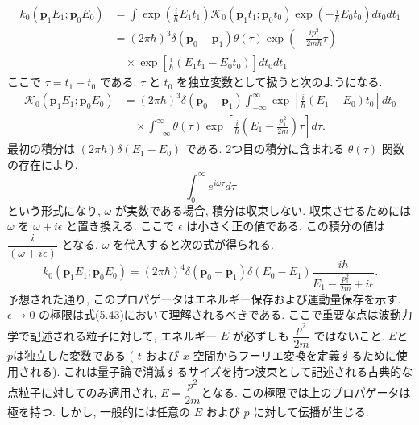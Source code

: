 \documentclass{jsarticle}
\begin{document}
\begin{align*}
    k_0(\mathbf{p}_1 E_1; \mathbf{p}_0 E_0) &= \int \exp \left( \frac{i}{\hbar} E_1 t_1 \right) \mathcal{K}_0(\mathbf{p}_1 t_1; \mathbf{p}_0 t_0) \exp \left( - \frac{i}{\hbar} E_0 t_0 \right) dt_0 dt_1 \\
    &= (2\pi \hbar)^3 \delta(\mathbf{p}_0 - \mathbf{p}_1) \theta(\tau) \exp \left( - \frac{ip_1^2}{2m\hbar} \tau \right) \\
    &\quad \times \exp \left[ \frac{i}{\hbar} (E_1 t_1 - E_0 t_0) \right] dt_0 dt_1 \tag{5.42}
\end{align*}
ここで $\tau = t_1 - t_0$ である. $\tau$ と $t_0$ を独立変数として扱うと次のようになる.
\begin{align*}
    \mathcal{K}_0(\mathbf{p}_1 E_1; \mathbf{p}_0 E_0) &= (2\pi \hbar)^3 \delta(\mathbf{p}_0 - \mathbf{p}_1) \int_{-\infty}^{\infty} \exp \left[ \frac{i}{\hbar} (E_1 - E_0) t_0 \right] dt_0 \\
    &\quad \times \int_{-\infty}^{\infty} \theta(\tau) \exp \left[ \frac{i}{\hbar} \left( E_1 - \frac{p_1^2}{2m} \right) \tau \right] d\tau.
\end{align*}
最初の積分は $(2\pi \hbar) \delta(E_1 - E_0)$ である. 2つ目の積分に含まれる $\theta(\tau)$ 関数の存在により,
\begin{equation*}
    \int_0^{\infty} e^{i\omega\tau} d\tau
\end{equation*}
という形式になり, $\omega$ が実数である場合, 積分は収束しない. 収束させるためには $\omega$ を $\omega + i\epsilon$ と置き換える. ここで $\epsilon$ は小さく正の値である. この積分の値は $\dfrac{i}{(\omega + i\epsilon)}$ となる. $\omega$ を代入すると次の式が得られる.
\begin{equation*}
    k_0(\mathbf{p}_1 E_1; \mathbf{p}_0 E_0) = (2\pi \hbar)^4 \delta(\mathbf{p}_0 - \mathbf{p}_1) \delta(E_0 - E_1) \frac{i\hbar}{E_1 - \frac{p_1^2}{2m} + i\epsilon}. \tag{5.43}
\end{equation*}
予想された通り, このプロパゲータはエネルギー保存および運動量保存を示す. $\epsilon \to 0$ の極限は式(5.43)において理解されるべきである. ここで重要な点は波動力学で記述される粒子に対して, エネルギー $E$ が必ずしも $\dfrac{p^2}{2m}$ ではないこと. $E$と$p$は独立した変数である ( $t$ および $x$ 空間からフーリエ変換を定義するために使用される). これは量子論で消滅するサイズを持つ波束として記述される古典的な点粒子に対してのみ適用され, $E = \dfrac{p^2}{2m}$となる. この極限では上のプロパゲータは極を持つ. しかし, 一般的には任意の $E$ および $p$ に対して伝播が生じる.\par
\end{document}
